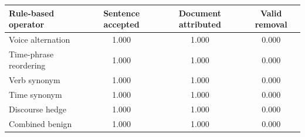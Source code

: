 \begin{tabular}{@{}lccc@{}}
\toprule
Rule-based operator & Sentence accepted & Document attributed & Valid removal \\
\midrule
Voice alternation & 1.000 & 1.000 & 0.000 \\
Time-phrase reordering & 1.000 & 1.000 & 0.000 \\
Verb synonym & 1.000 & 1.000 & 0.000 \\
Time synonym & 1.000 & 1.000 & 0.000 \\
Discourse hedge & 1.000 & 1.000 & 0.000 \\
Combined benign & 1.000 & 1.000 & 0.000 \\
\bottomrule
\end{tabular}
